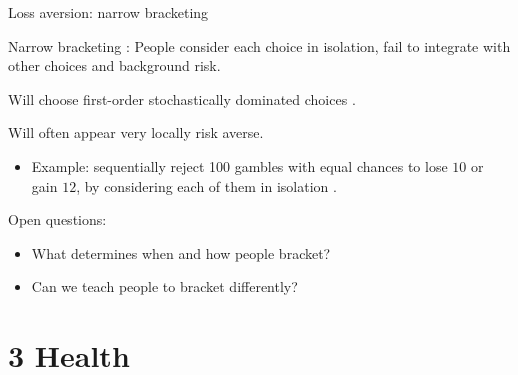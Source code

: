 \documentclass[aspectratio=169, 10pt, handout]{beamer}
\newenvironment{wideitemize}{\itemize\addtolength{\itemsep}{10pt}}{\enditemize}
\begin{document}
\begin{frame}{Loss aversion: narrow bracketing}

\begin{wideitemize}

	\item Narrow bracketing \citep{tversky1981framing}: People consider each choice in isolation, fail to integrate with other choices and background risk.

	\item Will choose first-order stochastically dominated choices \citep{rabin2009narrow}.

	\item Will often appear very locally risk averse.
	
	\begin{itemize}

		\item Example: sequentially reject 100 gambles with equal chances to lose $10$ or gain $12$, by considering each of them in isolation \citep{bellemare2005myopic,haigh2005professional}.

	\end{itemize}

	\item Open questions:
	
	\begin{itemize}
	    
	    \item What determines when and how people bracket?
        
        \item Can we teach people to bracket differently? 
	    
	\end{itemize}
	
	
\end{wideitemize}

\end{frame}

\section{3 Health}
\end{document}
